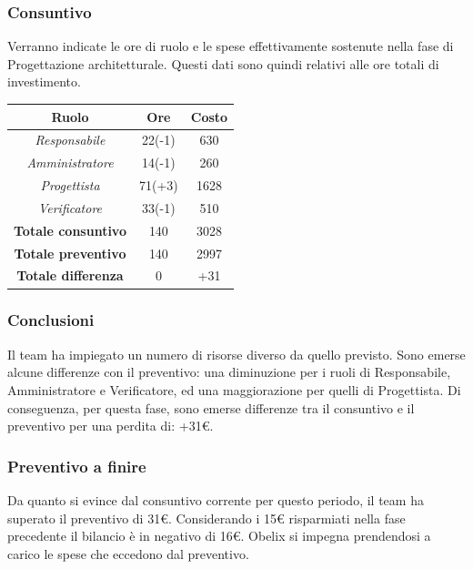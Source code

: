 \subsubsection{Consuntivo}

Verranno indicate le ore di ruolo e le spese effettivamente sostenute nella fase di Progettazione architetturale. Questi dati sono quindi relativi alle ore totali di investimento.

\begin{center}
	\centering
	\begin{tabular}{|c|c|c|}
		\hline
		\textbf{Ruolo} & \textbf{Ore} & \textbf{Costo} \\
		\hline
		\emph{Responsabile}  & 22(-1) & 630 \\
		\hline  \emph{Amministratore}  & 14(-1) & 260 \\
		\hline  \emph{Progettista}  & 71(+3) & 1628 \\
		\hline  \emph{Verificatore}  & 33(-1) & 510 \\
		\hline
		\textbf{Totale consuntivo} & 140 & 3028 \\
		\hline
		\textbf{Totale preventivo} & 140 & 2997 \\
		\hline
		\textbf{Totale differenza} & 0 & +31 \\
		\hline
	\end{tabular}
	
\end{center}

\subsubsection{Conclusioni}

Il team ha impiegato un numero di risorse diverso da quello previsto. Sono emerse alcune differenze con il preventivo: una diminuzione per i ruoli di Responsabile, Amministratore e Verificatore, ed una maggiorazione per quelli di Progettista. Di conseguenza, per questa fase, sono emerse differenze tra il consuntivo e il preventivo per una perdita di: +31€.

\subsubsection{Preventivo a finire}
Da quanto si evince dal consuntivo corrente per questo periodo, il team ha superato il preventivo
di 31€. Considerando i 15€ risparmiati nella fase precedente il bilancio è in negativo di 16€. Obelix si impegna prendendosi a carico le spese che eccedono dal preventivo. 


